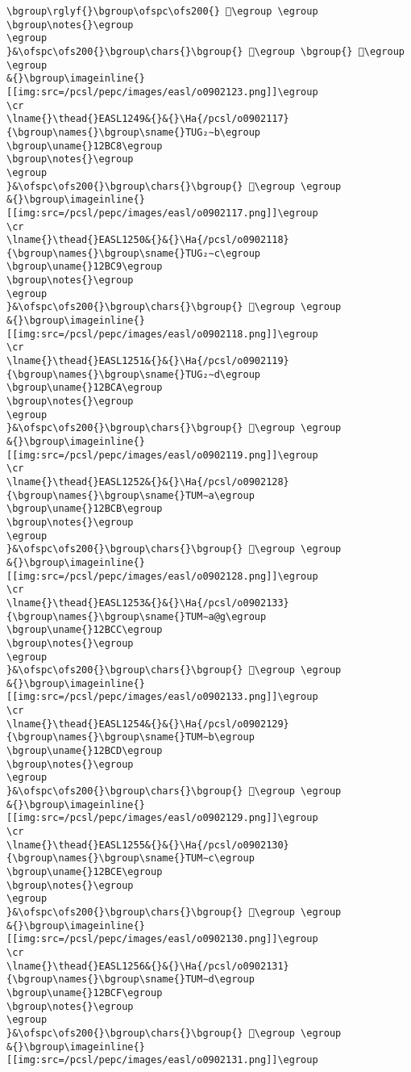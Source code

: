 \begin{verbatim}
\bgroup\rglyf{}\bgroup\ofspc\ofs200{} 𒯇\egroup \egroup
\bgroup\notes{}\egroup
\egroup
}&\ofspc\ofs200{}\bgroup\chars{}\bgroup{} 𒯆\egroup \bgroup{} 𒯇\egroup \egroup
&{}\bgroup\imageinline{}[[img:src=/pcsl/pepc/images/easl/o0902123.png]]\egroup
\cr
\lname{}\thead{}EASL1249&{}&{}\Ha{/pcsl/o0902117}{\bgroup\names{}\bgroup\sname{}TUG₂∼b\egroup
\bgroup\uname{}12BC8\egroup
\bgroup\notes{}\egroup
\egroup
}&\ofspc\ofs200{}\bgroup\chars{}\bgroup{} 𒯈\egroup \egroup
&{}\bgroup\imageinline{}[[img:src=/pcsl/pepc/images/easl/o0902117.png]]\egroup
\cr
\lname{}\thead{}EASL1250&{}&{}\Ha{/pcsl/o0902118}{\bgroup\names{}\bgroup\sname{}TUG₂∼c\egroup
\bgroup\uname{}12BC9\egroup
\bgroup\notes{}\egroup
\egroup
}&\ofspc\ofs200{}\bgroup\chars{}\bgroup{} 𒯉\egroup \egroup
&{}\bgroup\imageinline{}[[img:src=/pcsl/pepc/images/easl/o0902118.png]]\egroup
\cr
\lname{}\thead{}EASL1251&{}&{}\Ha{/pcsl/o0902119}{\bgroup\names{}\bgroup\sname{}TUG₂∼d\egroup
\bgroup\uname{}12BCA\egroup
\bgroup\notes{}\egroup
\egroup
}&\ofspc\ofs200{}\bgroup\chars{}\bgroup{} 𒯊\egroup \egroup
&{}\bgroup\imageinline{}[[img:src=/pcsl/pepc/images/easl/o0902119.png]]\egroup
\cr
\lname{}\thead{}EASL1252&{}&{}\Ha{/pcsl/o0902128}{\bgroup\names{}\bgroup\sname{}TUM∼a\egroup
\bgroup\uname{}12BCB\egroup
\bgroup\notes{}\egroup
\egroup
}&\ofspc\ofs200{}\bgroup\chars{}\bgroup{} 𒯋\egroup \egroup
&{}\bgroup\imageinline{}[[img:src=/pcsl/pepc/images/easl/o0902128.png]]\egroup
\cr
\lname{}\thead{}EASL1253&{}&{}\Ha{/pcsl/o0902133}{\bgroup\names{}\bgroup\sname{}TUM∼a@g\egroup
\bgroup\uname{}12BCC\egroup
\bgroup\notes{}\egroup
\egroup
}&\ofspc\ofs200{}\bgroup\chars{}\bgroup{} 𒯌\egroup \egroup
&{}\bgroup\imageinline{}[[img:src=/pcsl/pepc/images/easl/o0902133.png]]\egroup
\cr
\lname{}\thead{}EASL1254&{}&{}\Ha{/pcsl/o0902129}{\bgroup\names{}\bgroup\sname{}TUM∼b\egroup
\bgroup\uname{}12BCD\egroup
\bgroup\notes{}\egroup
\egroup
}&\ofspc\ofs200{}\bgroup\chars{}\bgroup{} 𒯍\egroup \egroup
&{}\bgroup\imageinline{}[[img:src=/pcsl/pepc/images/easl/o0902129.png]]\egroup
\cr
\lname{}\thead{}EASL1255&{}&{}\Ha{/pcsl/o0902130}{\bgroup\names{}\bgroup\sname{}TUM∼c\egroup
\bgroup\uname{}12BCE\egroup
\bgroup\notes{}\egroup
\egroup
}&\ofspc\ofs200{}\bgroup\chars{}\bgroup{} 𒯎\egroup \egroup
&{}\bgroup\imageinline{}[[img:src=/pcsl/pepc/images/easl/o0902130.png]]\egroup
\cr
\lname{}\thead{}EASL1256&{}&{}\Ha{/pcsl/o0902131}{\bgroup\names{}\bgroup\sname{}TUM∼d\egroup
\bgroup\uname{}12BCF\egroup
\bgroup\notes{}\egroup
\egroup
}&\ofspc\ofs200{}\bgroup\chars{}\bgroup{} 𒯏\egroup \egroup
&{}\bgroup\imageinline{}[[img:src=/pcsl/pepc/images/easl/o0902131.png]]\egroup

\end{verbatim}
